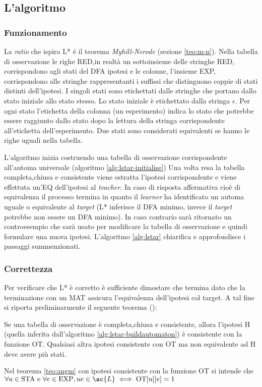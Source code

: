 \subsection{L'algoritmo}
\subsubsection{Funzionamento}La \textit{ratio} che ispira L* é il teorema \textit{Myhill-Nerode} (sezione \ref{teo:m-n}). Nella tabella di osservazione le righe RED,in realtà un sottoinsieme delle stringhe RED, corrispondono agli stati del DFA ipotesi e le colonne, l'insieme EXP, corrispondono alle stringhe rappresentanti i suffissi che distinguono coppie di stati distinti dell'ipotesi. I singoli stati sono etichettati dalle stringhe che portano dallo stato iniziale allo stato stesso. Lo stato iniziale è etichettato dalla stringa $\epsilon$. Per ogni stato l'etichetta della colonna (un esperimento) indica lo stato che potrebbe essere raggiunto dallo stato dopo la lettura della stringa corrispondente all'etichetta dell'esperimento. Due stati sono considerati equivalenti se hanno le righe uguali nella tabella.

L'algoritmo inizia costruendo una tabella di osservazione corrispondente all'automa universale (algoritmo \ref{alg:lstar-initialise})
Una volta resa la tabella completa,chiusa e consistente viene estratta l'ipotesi corrispondente e viene effettuta un'\ac{EQ} dell'ipotesi al \textit{teacher}. In caso di risposta affermativa cioè di equivalenza il processo termina in quanto il \textit{learner} ha identificato un automa uguale o equivalente al \textit{target} (L* inferisce il DFA minimo, invece il \textit{target} potrebbe non essere un DFA minimo). In caso contrario sarà ritornato un controesempio che sarà usato per modificare la tabella di osservazione e quindi formulare una nuova ipotesi. L'algoritmo \ref{alg:lstar} chiarifica e approfondisce i passaggi summenzionati.

\subsubsection{Correttezza}
\label{sub:cor}
Per verificare che L* è corretto è sufficiente dimostare che termina dato che la terminazione con un  \ac{MAT} assicura l'equivalenza dell'ipotesi col target.
A tal fine si riporta preliminarmente il seguente teorema (\cite{Angluin87}):
\begin{teorema}
\label{teo:angm}
Se una tabella di osservazione è completa,chiusa e consistente, allora l'ipotesi \ac{H} (quella inferita dall'algoritmo \ref{alg:lstar-buildautomaton}) è consistente con la funzione OT. Qualsiasi altra ipotesi consistente con OT ma non equivalente ad \ac{H} deve avere più stati.
\end{teorema}
Nel teorema \ref{teo:angm} con ipotesi consistente con la funzione OT si intende che $\forall u \in \text{STA e } \forall e \in \text{EXP},  ue \in \ac{L} \iff \text{OT}[u][e] = 1$

